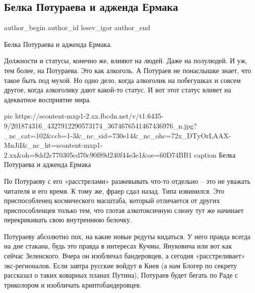  
 
 
 
 
 
\subsection{Белка Потураева и адженда Ермака}
\label{sec:18_06_2021.fb.lesev_igor.1.poturaev_jermak}
\ifcmt
 author_begin
   author_id lesev_igor
 author_end
\fi

Белка Потураева и адженда Ермака.

Должности и статусы, конечно же, влияют на людей. Даже на полулюдей. И уж, тем
более, на Потураева. Это как алкоголь. А Потураев не понаслышке знает, что
такое быть под мухой. Но одно дело, когда алкоголик на побегушках и совсем
другое, когда алкоголику дают какой-то статус. И вот этот статус влияет на
адекватное восприятие мира.

\ifcmt
  pic https://scontent-mxp1-2.xx.fbcdn.net/v/t1.6435-9/201874316_4327912290573174_3674676541467436976_n.jpg?_nc_cat=102&ccb=1-3&_nc_sid=730e14&_nc_ohc=72x_DTyOrLAAX-MnJiI&_nc_ht=scontent-mxp1-2.xx&oh=8dd2c770305cd70c90f89d240f44e3e1&oe=60D74BB1
	caption Белка Потураева и адженда Ермака
\fi

По Потураеву с его «расстрелами» разжевывать что-то отдельно – это не уважать
читателя и его время. К тому же, фраер сдал назад. Типа извинился. Это
приспособленец космического масштаба, который отличается от других
приспособленцев только тем, что глотая алкотоксичную слюну тут же начинает
перекрикивать свою внутреннюю белочку.

Потураеву абсолютно пох, на какие новые редуты кидаться. У него правда всегда
на дне стакана, будь это правда в интересах Кучмы, Януковича или вот как сейчас
Зеленского. Вчера он изобличал бандеровцев, а сегодня «расстреливает»
экс-регионалов. Если завтра русские войдут в Киев (а нам Блогер по секрету
рассказал о таких коварных планах Путина), Потураев будет бегать по Раде с
триколором и изобличать криптобандеровцев.

